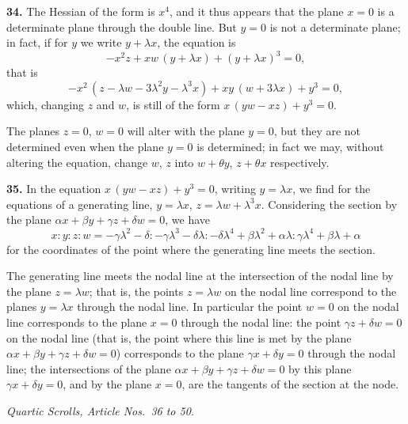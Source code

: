 \documentclass[11pt,a4paper]{article}
\begin{document}
\medskip

\textbf{34.} The Hessian of the form is $x^{4}$, and it thus appears that the plane $x = 0$ is a determinate plane through the double line. But $y = 0$ is not a determinate plane; in fact, if for $y$ we write $y + \lambda x$, the equation is
\[
- x^{2}z + xw\,(y + \lambda x) + (y + \lambda x)^{3} = 0,
\]
that is
\[
- x^{2}\,(z - \lambda w - 3\lambda^{2} y - \lambda^{3} x) + xy\,(w + 3\lambda x) + y^{3} = 0,
\]
which, changing $z$ and $w$, is still of the form $x\,(yw - xz) + y^{3} = 0$.

\medskip

The planes $z = 0$, $w = 0$ will alter with the plane $y = 0$, but they are not determined even when the plane $y = 0$ is determined; in fact we may, without altering the equation, change $w,\,z$ into $w + \theta y$, $z + \theta x$ respectively.

\medskip

\textbf{35.} In the equation $x\,(yw - xz) + y^{3} = 0$, writing $y = \lambda x$, we find for the equations of a generating line, $y = \lambda x$, $z = \lambda w + \lambda^{3} x$. Considering the section by the plane $\alpha x + \beta y + \gamma z + \delta w = 0$, we have
\[
x : y : z : w = -\gamma\lambda^{2} - \delta : -\gamma\lambda^{3} - \delta\lambda : -\delta\lambda^{4} + \beta\lambda^{2} + \alpha\lambda : \gamma\lambda^{4} + \beta\lambda + \alpha
\]
for the coordinates of the point where the generating line meets the section.

\medskip

The generating line meets the nodal line at the intersection of the nodal line by the plane $z = \lambda w$; that is, the points $z = \lambda w$ on the nodal line correspond to the planes $y = \lambda x$ through the nodal line. In particular the point $w = 0$ on the nodal line corresponds to the plane $x = 0$ through the nodal line: the point $\gamma z + \delta w = 0$ on the nodal line (that is, the point where this line is met by the plane $\alpha x + \beta y + \gamma z + \delta w = 0$) corresponds to the plane $\gamma x + \delta y = 0$ through the nodal line; the intersections of the plane $\alpha x + \beta y + \gamma z + \delta w = 0$ by this plane $\gamma x + \delta y = 0$, and by the plane $x = 0$, are the tangents of the section at the node.

\bigskip

\begin{center}
\textit{Quartic Scrolls, Article Nos.\ 36 to 50.}
\end{center}
\end{document}
